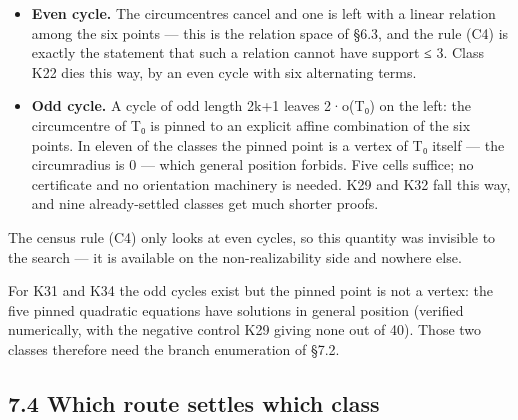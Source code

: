 \documentclass[11pt,a4paper]{article}
\theoremstyle{named}
\begin{document}
\begin{itemize}[leftmargin=1.4em,itemsep=.2em,topsep=.3em]
\item \textbf{Even cycle.} The circumcentres cancel and one is left with a linear relation among the six points — this is the relation space of §6.3, and the rule (C4) is exactly the statement that such a relation cannot have support ≤ 3. Class K22 dies this way, by an even cycle with six alternating terms.
\item \textbf{Odd cycle.} A cycle of odd length 2k+1 leaves 2·o(T₀) on the left: the circumcentre of T₀ is pinned to an explicit affine combination of the six points. In eleven of the classes the pinned point is a vertex of T₀ itself — the circumradius is 0 — which general position forbids. Five cells suffice; no certificate and no orientation machinery is needed. K29 and K32 fall this way, and nine already-settled classes get much shorter proofs.
\end{itemize}

The census rule (C4) only looks at even cycles, so this quantity was invisible to the search — it is available on the non-realizability side and nowhere else.

For K31 and K34 the odd cycles exist but the pinned point is not a vertex: the five pinned quadratic equations have solutions in general position (verified numerically, with the negative control K29 giving none out of 40). Those two classes therefore need the branch enumeration of §7.2.

\subsection*{7.4 Which route settles which class}
\end{document}
